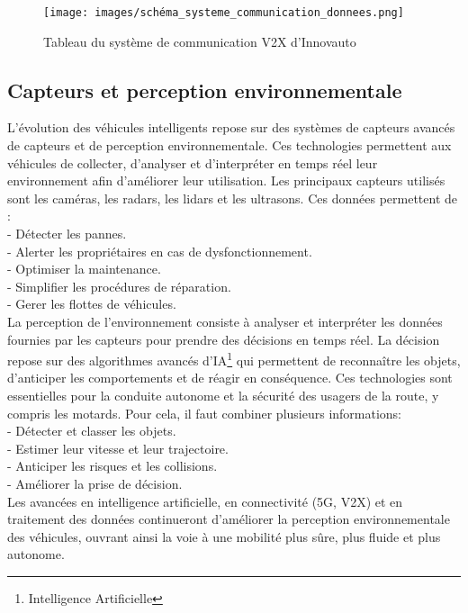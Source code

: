 \documentclass{article}
\begin{document}
\begin{figure}[h]
    \centering
    \texttt{[image: images/schéma\_systeme\_communication\_donnees.png]} 
    \caption{Tableau du système de communication V2X d'Innovauto}
\end{figure}


\subsection{Capteurs et perception environnementale}
L'évolution des véhicules intelligents repose sur des systèmes de capteurs avancés de capteurs et de perception environnementale.
Ces technologies permettent aux véhicules de collecter, d'analyser et d'interpréter en temps réel leur environnement afin d'améliorer leur utilisation.
Les principaux capteurs utilisés sont les caméras, les radars, les lidars et les ultrasons.
Ces données permettent de :\\
- Détecter les pannes. \\
- Alerter les propriétaires en cas de dysfonctionnement. \\
- Optimiser la maintenance. \\
- Simplifier les procédures de réparation. \\
- Gerer les flottes de véhicules. \\


La perception de l'environnement consiste à analyser et interpréter les données fournies par les capteurs pour prendre des décisions en temps réel. La décision repose sur des algorithmes avancés d'IA\footnote{Intelligence Artificielle} qui permettent de reconnaître les objets, d'anticiper les comportements et de réagir en conséquence. Ces technologies sont essentielles pour la conduite autonome et la sécurité des usagers de la route, y compris les motards.
Pour cela, il faut combiner plusieurs informations:\\
- Détecter et classer les objets. \\
- Estimer leur vitesse et leur trajectoire. \\
- Anticiper les risques et les collisions. \\
- Améliorer la prise de décision.\\
Les avancées en intelligence artificielle, en connectivité (5G, V2X) et en traitement des données continueront d’améliorer la perception environnementale des véhicules, ouvrant ainsi la voie à une mobilité plus sûre, plus fluide et plus autonome. 
\end{document}
